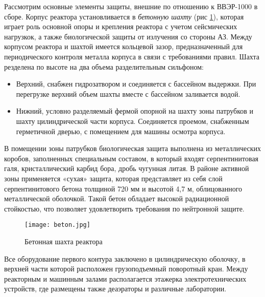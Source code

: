 Рассмотрим основные элементы защиты, внешние по отношению к ВВЭР-1000 в сборе. Корпус реактора установливается в \textit{бетонную шахту} (рис \ref{pic:beton_shakhta}), которая играет роль основной опоры и крепления реактора с учетом сейсмических нагрузкок, а также биологической защиты от излучения со стороны АЗ. Между корпусом реактора и шахтой имеется кольцевой зазор, предназначенный для периодического контроля металла корпуса в связи с требованиями правил. Шахта резделена по высоте на два объема разделительным сильфоном: 
\begin{itemize}
	\item Верхний, снабжен гидрозатвором и соединяется с бассейном выдержки. При перегрузке верхний объем шахты вместе с бассейном заливается водой.
	\item Нижний, условно разделяемый фермой опорной на шахту зоны патрубков и шахту цилиндрической части корпуса. Соединяется проемом, снабженным герметичной дверью, с помещением для машины осмотра корпуса.
\end{itemize}
В помещении зоны патрубков
биологическая защита выполнена из металлических коробов, заполненных специальным составом, в который входят серпентинитовая галя, кристаллический карбид бора, дробь чугунная литая. В районе активной зоны применяется «сухая» защита, которая представляет из себя слой серпентинитового бетона толщиной
720 мм и высотой 4,7 м, облицованного металлической оболочкой. Такой бетон обладает высокой радиационной стойкостью, что позволяет удовлетворить требования по нейтронной защите. \cite{лескин2011физические}

\begin{figure}[H]
	\begin{center}
		\texttt{[image: beton.jpg]}
		\caption{
			Бетонная шахта реактора 
		}
		\label{pic:beton_shakhta} %
	\end{center}
\end{figure}

Все оборудование первого контура заключено в цилиндрическую оболочку, в верхней части которой расположен грузоподъемный поворотный кран. Между реакторным и машинным залами располагается этажерка электротехнических устройств, где размещены также деаэраторы и различные лаборатории.

